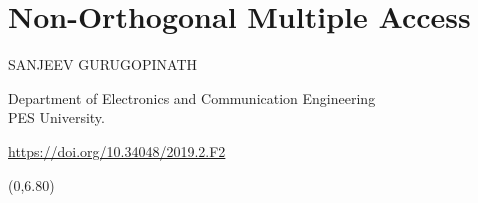 \chapter{Non-Orthogonal Multiple Access}

\begin{center}
{\large\uppercase{Sanjeev Gurugopinath}} 

\vskip -6pt

Department of Electronics and Communication Engineering\\ 
PES University.
\end{center}

\vskip 1.5cm

\centerline{\url{https://doi.org/10.34048/2019.2.F2}}

\vfill

\begin{textblock}{16}(0,6.80)
\noindent{}
\end{textblock}
\newpage

